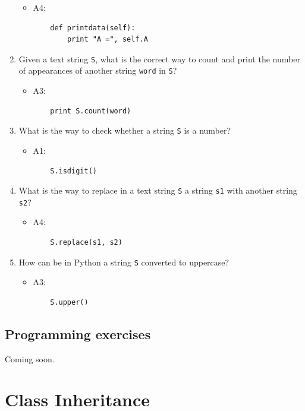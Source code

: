 \documentclass[article,A4,12pt]{llncs}
\begin{document}
\begin{enumerate}
  \begin{itemize}
    \item A4:
\begin{verbatim}
    def printdata(self):
        print "A =", self.A
\end{verbatim}
  \end{itemize}
\item Given a text string {\tt S}, what is the correct way to count and print the number 
      of appearances of another string {\tt word} in {\tt S}?
  \begin{itemize}
    \item A3:
\begin{verbatim}
    print S.count(word)
\end{verbatim}
    \end{itemize}
\item What is the way to check whether a string {\tt S} is a number?
  \begin{itemize}
    \item A1:
\begin{verbatim}
    S.isdigit()
\end{verbatim}
    \end{itemize}
\item What is the way to replace in a text string {\tt S} a string {\tt s1} with another string {\tt s2}?
  \begin{itemize}
    \item A4:
\begin{verbatim}
    S.replace(s1, s2)
\end{verbatim}
    \end{itemize}
\item How can be in Python a string {\tt S} converted to uppercase?
  \begin{itemize}
    \item A3:
\begin{verbatim}
    S.upper()
\end{verbatim}
  \end{itemize}

\end{enumerate}


\subsection{Programming exercises}

Coming soon.

\section{Class Inheritance}
\end{document}
